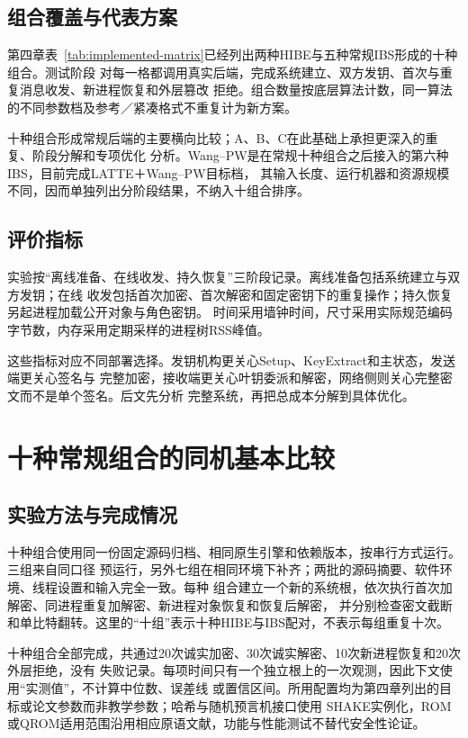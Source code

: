 \subsection{组合覆盖与代表方案}

第四章表~\ref{tab:implemented-matrix}已经列出两种HIBE与五种常规IBS形成的十种组合。测试阶段
对每一格都调用真实后端，完成系统建立、双方发钥、首次与重复消息收发、新进程恢复和外层篡改
拒绝。组合数量按底层算法计数，同一算法的不同参数档及参考／紧凑格式不重复计为新方案。

十种组合形成常规后端的主要横向比较；A、B、C在此基础上承担更深入的重复、阶段分解和专项优化
分析。Wang--PW是在常规十种组合之后接入的第六种IBS，目前完成LATTE＋Wang--PW目标档，
其输入长度、运行机器和资源规模不同，因而单独列出分阶段结果，不纳入十组合排序。

\subsection{评价指标}

实验按“离线准备、在线收发、持久恢复”三阶段记录。离线准备包括系统建立与双方发钥；在线
收发包括首次加密、首次解密和固定密钥下的重复操作；持久恢复另起进程加载公开对象与角色密钥。
时间采用墙钟时间，尺寸采用实际规范编码字节数，内存采用定期采样的进程树RSS峰值。

这些指标对应不同部署选择。发钥机构更关心Setup、KeyExtract和主状态，发送端更关心签名与
完整加密，接收端更关心叶钥委派和解密，网络侧则关心完整密文而不是单个签名。后文先分析
完整系统，再把总成本分解到具体优化。

\section{十种常规组合的同机基本比较}

\subsection{实验方法与完成情况}

十种组合使用同一份固定源码归档、相同原生引擎和依赖版本，按串行方式运行。三组来自同口径
预运行，另外七组在相同环境下补齐；两批的源码摘要、软件环境、线程设置和输入完全一致。每种
组合建立一个新的系统根，依次执行首次加解密、同进程重复加解密、新进程对象恢复和恢复后解密，
并分别检查密文截断和单比特翻转。这里的“十组”表示十种HIBE与IBS配对，不表示每组重复十次。

十种组合全部完成，共通过20次诚实加密、30次诚实解密、10次新进程恢复和20次外层拒绝，没有
失败记录。每项时间只有一个独立根上的一次观测，因此下文使用“实测值”，不计算中位数、误差线
或置信区间。所用配置均为第四章列出的目标或论文参数而非教学参数；哈希与随机预言机接口使用
SHAKE实例化，ROM或QROM适用范围沿用相应原语文献，功能与性能测试不替代安全性论证。

